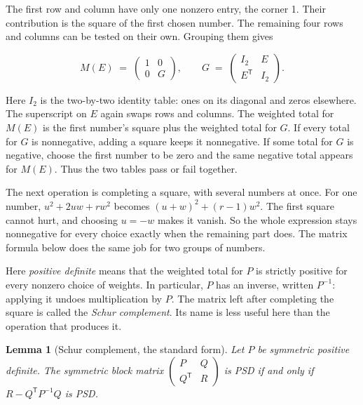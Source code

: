 \documentclass[11pt,twoside]{article}
\theoremstyle{thielethm}
\newtheorem{lemma}[theorem]{Lemma}
\theoremstyle{thieledef}
\theoremstyle{thieledef}
\theoremstyle{thieledef}
\theoremstyle{thielethm}
\theoremstyle{thieleobs}
\theoremstyle{thielethm}
\begin{document}
The first row and column have only one nonzero entry, the corner 1. Their
contribution is the square of the first chosen number. The remaining four
rows and columns can be tested on their own. Grouping them gives

\[
M(E) \;=\; \begin{pmatrix} 1 & 0 \\ 0 & G \end{pmatrix},
\qquad
G \;=\; \begin{pmatrix} I_2 & E \\ E^{\mathsf T} & I_2 \end{pmatrix}.
\]

Here $I_2$ is the two-by-two identity table: ones on its diagonal and zeros
elsewhere. The superscript on $E$ again swaps rows and columns. The weighted
total for $M(E)$ is the first number's square plus the weighted total for $G$.
If every total for $G$ is nonnegative, adding a square keeps it nonnegative.
If some total for $G$ is negative, choose the first number to be zero and the
same negative total appears for $M(E)$. Thus the two tables pass or fail
together.

The next operation is completing a square, with several numbers at once.
For one number, $u^2+2uw+rw^2$ becomes $(u+w)^2+(r-1)w^2$.
The first square cannot hurt, and choosing $u=-w$ makes it vanish.
So the whole expression stays nonnegative for every choice exactly when
the remaining part does. The matrix formula below does the same job for
two groups of numbers.

Here \emph{positive definite} means that the weighted total for $P$ is
strictly positive for every nonzero choice of weights. In particular, $P$
has an inverse, written $P^{-1}$: applying it undoes multiplication by $P$.
The matrix left after completing the square is called the \emph{Schur
complement}. Its name is less useful here than the operation that produces it.

\begin{lemma}[Schur complement, the standard form]
Let $P$ be symmetric positive definite. The symmetric block matrix
$\begin{pmatrix} P & Q \\ Q^{\mathsf T} & R \end{pmatrix}$ is PSD if and only if
$R - Q^{\mathsf T} P^{-1} Q$ is PSD.
\end{lemma}
\end{document}
